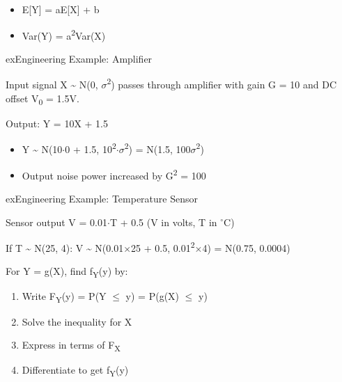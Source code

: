 \begin{itemize}
\tightlist
\item
  E[Y] = aE[X] + b
\item
  Var(Y) = a\textsuperscript{2}Var(X)
\end{itemize}

\begin{PSbox}[unbreakable]{ex}{Engineering Example: Amplifier}

Input signal X \textasciitilde{} N(0, \ensuremath{\sigma}\textsuperscript{2}) passes through amplifier with gain G = 10 and DC offset V\textsubscript{0} = 1.5V.

Output: Y = 10X + 1.5

\begin{itemize}
\tightlist
\item
  Y \textasciitilde{} N(10\ensuremath{\cdot}0 + 1.5, 10\textsuperscript{2}\ensuremath{\cdot}\ensuremath{\sigma}\textsuperscript{2}) = N(1.5, 100\ensuremath{\sigma}\textsuperscript{2})
\item
  Output noise power increased by G\textsuperscript{2} = 100
\end{itemize}

\end{PSbox}

\begin{PSbox}[unbreakable]{ex}{Engineering Example: Temperature Sensor}

Sensor output V = 0.01\ensuremath{\cdot}T + 0.5 (V in volts, T in \ensuremath{^{\circ}}C)

If T \textasciitilde{} N(25, 4): V \textasciitilde{} N(0.01\ensuremath{\times}25 + 0.5, 0.01\textsuperscript{2}\ensuremath{\times}4) = N(0.75, 0.0004)

\end{PSbox}



For Y = g(X), find f\textsubscript{Y}(y) by:

\begin{enumerate}
\def\labelenumi{\arabic{enumi}.}
\tightlist
\item
  Write F\textsubscript{Y}(y) = P(Y \ensuremath{\le} y) = P(g(X) \ensuremath{\le} y)
\item
  Solve the inequality for X
\item
  Express in terms of F\textsubscript{X}
\item
  Differentiate to get f\textsubscript{Y}(y)
\end{enumerate}

